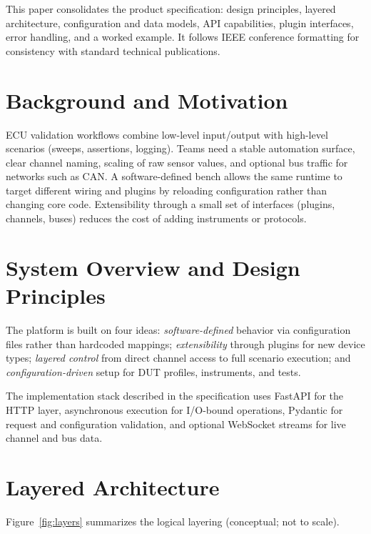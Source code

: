 \documentclass[conference]{IEEEtran}
\begin{document}
This paper consolidates the product specification: design principles, layered architecture, configuration and data models, API capabilities, plugin interfaces, error handling, and a worked example. It follows IEEE conference formatting for consistency with standard technical publications.

\section{Background and Motivation}

ECU validation workflows combine low-level input/output with high-level scenarios (sweeps, assertions, logging). Teams need a stable automation surface, clear channel naming, scaling of raw sensor values, and optional bus traffic for networks such as CAN. A software-defined bench allows the same runtime to target different wiring and plugins by reloading configuration rather than changing core code. Extensibility through a small set of interfaces (plugins, channels, buses) reduces the cost of adding instruments or protocols.

\section{System Overview and Design Principles}

The platform is built on four ideas: \emph{software-defined} behavior via configuration files rather than hardcoded mappings; \emph{extensibility} through plugins for new device types; \emph{layered control} from direct channel access to full scenario execution; and \emph{configuration-driven} setup for DUT profiles, instruments, and tests.

The implementation stack described in the specification uses FastAPI for the HTTP layer, asynchronous execution for I/O-bound operations, Pydantic for request and configuration validation, and optional WebSocket streams for live channel and bus data.

\section{Layered Architecture}

Figure~\ref{fig:layers} summarizes the logical layering (conceptual; not to scale).
\end{document}
